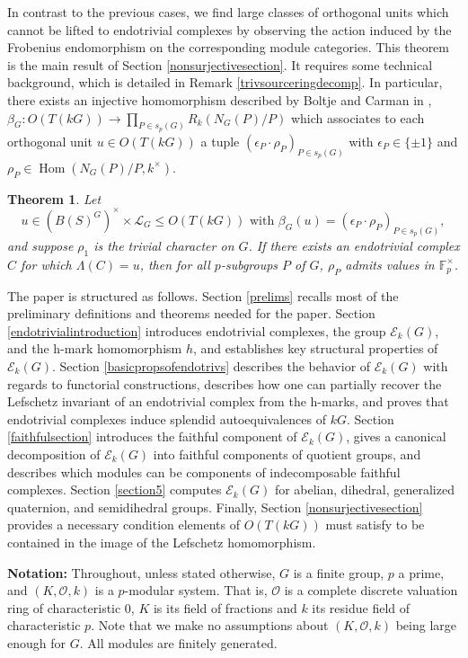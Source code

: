\documentclass[10pt,letterpaper, boxed, cm]{amsart}
\newcommand{\Hom}{\operatorname{Hom}}
\newcommand{\bigO}{\mathcal{O}}
\newcommand{\calE}{\mathcal{E}}
\newcommand{\calL}{\mathcal{L}}
\newtheorem{theorem}{Theorem}[section]
\theoremstyle{remark}
\theoremstyle{definition}
\begin{document}
    In contrast to the previous cases, we find large classes of orthogonal units which cannot be lifted to endotrivial complexes by observing the action induced by the Frobenius endomorphism on the corresponding module categories. This theorem is the main result of Section \ref{nonsurjectivesection}. It requires some technical background, which is detailed in Remark \ref{trivsourceringdecomp}. In particular, there exists an injective homomorphism described by Boltje and Carman in \cite[Theorem A]{BC23}, $\beta_G: O(T(kG)) \to \prod_{P \in s_p(G)} R_k(N_G(P)/P)$ which associates to each orthogonal unit $u \in O(T(kG))$ a tuple $(\epsilon_P\cdot \rho_P)_{P \in s_p(G)}$ with $\epsilon_P \in \{\pm 1\}$ and $\rho_P \in \Hom(N_G(P)/P, k^\times)$.

	\begin{theorem}
		Let \[ u \in (B(S)^G)^\times \times \calL_G \leq O(T(kG)) \text{  with  } \beta_G(u) = (\epsilon_P \cdot \rho_P)_{P\in s_p(G)},\]and suppose $\rho_1$ is the trivial character on $G$. If there exists an endotrivial complex $C$ for which $\Lambda(C) = u$, then for all $p$-subgroups $P$ of $G$, $\rho_P$ admits values in $\mathbb{F}_p^\times$.
	\end{theorem}

	The paper is structured as follows. Section \ref{prelims} recalls most of the preliminary definitions and theorems needed for the paper. Section \ref{endotrivialintroduction} introduces endotrivial complexes, the group $\calE_k(G)$, and the h-mark homomorphism $h$, and establishes key structural properties of $\calE_k(G)$. Section \ref{basicpropsofendotrivs} describes the behavior of $\calE_k(G)$ with regards to functorial constructions, describes how one can partially recover the Lefschetz invariant of an endotrivial complex from the h-marks, and proves that endotrivial complexes induce splendid autoequivalences of $kG$. Section \ref{faithfulsection} introduces the faithful component of $\calE_k(G)$, gives a canonical decomposition of $\calE_k(G)$ into faithful components of quotient groups, and describes which modules can be components of indecomposable faithful complexes. Section \ref{section5} computes $\calE_k(G)$ for abelian, dihedral, generalized quaternion, and semidihedral groups. Finally, Section \ref{nonsurjectivesection} provides a necessary condition elements of $O(T(kG))$ must satisfy to be contained in the image of the Lefschetz homomorphism.

	\textbf{Notation:} Throughout, unless stated otherwise, $G$ is a finite group, $p$ a prime, and $(K, \bigO, k)$ is a $p$-modular system. That is, $\bigO$ is a complete discrete valuation ring of characteristic 0, $K$ is its field of fractions and $k$ its residue field of characteristic $p$. Note that we make no assumptions about $(K, \bigO, k)$ being large enough for $G$. All modules are finitely generated.
\end{document}
